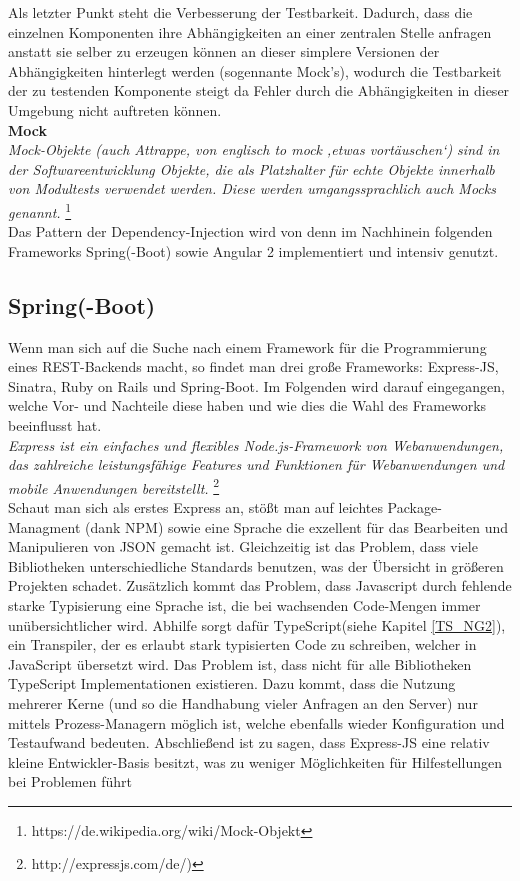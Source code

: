 Als letzter Punkt steht die Verbesserung der Testbarkeit. Dadurch, dass die einzelnen Komponenten ihre Abhängigkeiten an einer zentralen Stelle anfragen anstatt sie selber zu erzeugen können an dieser simplere Versionen der Abhängigkeiten hinterlegt werden (sogennante Mock's), wodurch die Testbarkeit der zu testenden Komponente steigt da Fehler durch die Abhängigkeiten in dieser Umgebung nicht auftreten können. \\

\newpage
\textbf{Mock} \\
\emph{\glqq   
Mock-Objekte (auch Attrappe, von englisch to mock ‚etwas vortäuschen‘) sind in der Softwareentwicklung Objekte, die als Platzhalter für echte Objekte innerhalb von Modultests verwendet werden. Diese werden umgangssprachlich auch Mocks genannt.
\grqq} \footnote{https://de.wikipedia.org/wiki/Mock-Objekt} \\

Das Pattern der Dependency-Injection wird von denn im Nachhinein folgenden Frameworks Spring(-Boot) sowie Angular 2 implementiert und intensiv genutzt.

\subsection{Spring(-Boot)}

Wenn man sich auf die Suche nach einem Framework für die Programmierung eines REST-Backends macht, so findet man drei große Frameworks: Express-JS, Sinatra, Ruby on Rails und Spring-Boot. Im Folgenden wird darauf eingegangen, welche Vor- und Nachteile diese haben und wie dies die Wahl des Frameworks beeinflusst hat. \\

\emph{\glqq   
Express ist ein einfaches und flexibles Node.js-Framework von Webanwendungen, das zahlreiche leistungsfähige Features und Funktionen für Webanwendungen und mobile Anwendungen bereitstellt.
\grqq} \footnote{http://expressjs.com/de/)} \\

Schaut man sich als erstes Express an, stößt man auf leichtes Package-Managment (dank NPM) sowie eine Sprache die exzellent für das Bearbeiten und Manipulieren von JSON gemacht ist. Gleichzeitig ist das Problem, dass viele Bibliotheken unterschiedliche Standards benutzen, was der Übersicht in größeren Projekten schadet. Zusätzlich kommt das Problem, dass Javascript durch fehlende starke Typisierung eine Sprache ist, die bei wachsenden Code-Mengen immer unübersichtlicher wird.
Abhilfe sorgt dafür TypeScript(siehe Kapitel \ref{TS_NG2}), ein Transpiler, der es erlaubt stark typisierten Code zu schreiben, welcher in JavaScript übersetzt wird. Das Problem ist, dass nicht für alle Bibliotheken TypeScript Implementationen existieren. Dazu kommt, dass die Nutzung mehrerer Kerne (und so die Handhabung vieler Anfragen an den Server) nur mittels Prozess-Managern möglich ist, welche ebenfalls wieder Konfiguration und Testaufwand bedeuten. Abschließend ist zu sagen, dass Express-JS eine relativ kleine Entwickler-Basis besitzt, was zu weniger Möglichkeiten für Hilfestellungen bei Problemen führt \\

